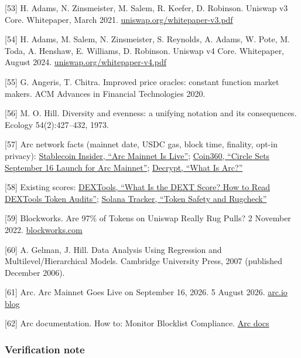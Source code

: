 {[}53{]} H. Adams, N. Zinsmeister, M. Salem, R. Keefer, D. Robinson. Uniswap v3 Core. Whitepaper, March 2021. \href{https://uniswap.org/whitepaper-v3.pdf}{uniswap.org/whitepaper-v3.pdf}

{[}54{]} H. Adams, M. Salem, N. Zinsmeister, S. Reynolds, A. Adams, W. Pote, M. Toda, A. Henshaw, E. Williams, D. Robinson. Uniswap v4 Core. Whitepaper, August 2024. \href{https://uniswap.org/whitepaper-v4.pdf}{uniswap.org/whitepaper-v4.pdf}

{[}55{]} G. Angeris, T. Chitra. Improved price oracles: constant function market makers. ACM Advances in Financial Technologies 2020.

{[}56{]} M. O. Hill. Diversity and evenness: a unifying notation and its consequences. Ecology 54(2):427--432, 1973.

{[}57{]} Arc network facts (mainnet date, USDC gas, block time, finality, opt-in privacy): \href{https://stablecoininsider.org/arc-mainnet-live/}{Stablecoin Insider, ``Arc Mainnet Is Live''}; \href{https://coin360.com/news/circle-arc-mainnet-launch-revenue-miss}{Coin360, ``Circle Sets September 16 Launch for Arc Mainnet''}; \href{https://decrypt.co/340212/what-is-arc-the-stablecoin-blockchain-from-usdc-issuer-circle}{Decrypt, ``What Is Arc?''}

{[}58{]} Existing scores: \href{https://www.dextools.io/tutorials/what-is-dext-score-token-audit}{DEXTools, ``What Is the DEXT Score? How to Read DEXTools Token Audits''}; \href{https://docs.solanatracker.io/guides/token-safety.md}{Solana Tracker, ``Token Safety and Rugcheck''}

{[}59{]} Blockworks. Are 97\% of Tokens on Uniswap Really Rug Pulls? 2 November 2022. \href{https://blockworks.com/news/are-97-of-tokens-on-uniswap-really-rug-pulls}{blockworks.com}

{[}60{]} A. Gelman, J. Hill. Data Analysis Using Regression and Multilevel/Hierarchical Models. Cambridge University Press, 2007 (published December 2006).

{[}61{]} Arc. Arc Mainnet Goes Live on September 16, 2026. 5 August 2026. \href{https://arc.io/blog/arc-mainnet-goes-live-on-september-16-2026}{arc.io blog}

{[}62{]} Arc documentation. How to: Monitor Blocklist Compliance. \href{https://docs.arc.io/integrate/infrastructure/compliance}{Arc docs}

\subsubsection{Verification note}\label{verification-note}

